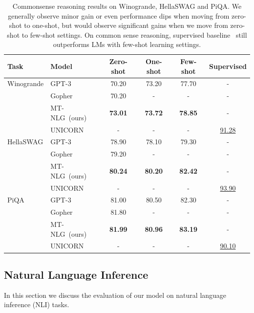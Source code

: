 \documentclass[11pt]{article}
\newcommand{\ours}{MT-NLG}
\begin{document}
\begin{table}[t]
\centering
\small
\begin{tabular}{l l c c c c}
 \toprule
 \textbf{Task} & \textbf{Model} &  \textbf{Zero-shot}  &  \textbf{One-shot} &  \textbf{Few-shot} & \textbf{Supervised} \\
 \midrule
 Winogrande & GPT-3	&	70.20	&	73.20	&	77.70 & -	\\
        & Gopher	&	70.20	&	-	&	- & -	\\
        & \ours~(ours)  &   \textbf{73.01}   &   \textbf{73.72}   &   \textbf{78.85} & -  \\
        \cmidrule{2-6}
        & UNICORN  &   -   &   -   &   - &  \underline{91.28}  \\
 \midrule
 HellaSWAG & GPT-3	&	78.90	&	78.10	&	79.30 & -	\\
        & Gopher	&	79.20	&	-	&	- & -	\\
        & \ours~(ours)  &   \textbf{80.24}   &   \textbf{80.20}   &   \textbf{82.42} & -  \\
        \cmidrule{2-6}
        & UNICORN  &   -   &   -   &   - &  \underline{93.90}  \\
 \midrule
 PiQA   & GPT-3	&	81.00	&	80.50	&	82.30 & -	\\
        & Gopher	&	81.80	&	-	&	- & -	\\
        & \ours~(ours)  &   \textbf{81.99}   &  \textbf{80.96}   &   \textbf{83.19} & -  \\
        \cmidrule{2-6}
        & UNICORN  &   -   &   -   &   - &  \underline{90.10}  \\
        
 \bottomrule
\end{tabular}
\caption{Commonsense reasoning results on Winogrande, HellaSWAG and PiQA. We generally observe minor gain or even performance dips when moving from zero-shot to one-shot, but would observe significant gains when we move from zero-shot to few-shot settings. On common sense reasoning, supervised baseline~\citep{Lourie2021UNICORNOR} still outperforms LMs with few-shot learning settings.}
\label{tab:commonsense-perf}
\end{table}

\subsection{Natural Language Inference}

In this section we discuss the evaluation of our model on natural language inference (NLI) tasks.
\end{document}
